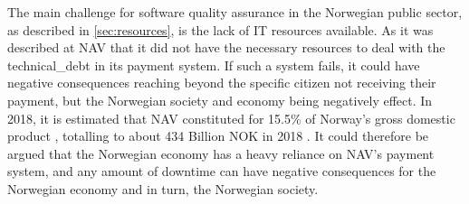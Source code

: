 The main challenge for software quality assurance in the Norwegian public sector, as described in \autoref{sec:resources}, is the lack of IT resources available. As it was described at NAV that it did not have the necessary resources to deal with the \gls{technical_debt} in its payment system. If such a system fails, it could have negative consequences reaching beyond the specific citizen not receiving their payment, but the Norwegian society and economy being negatively effect. In 2018, it is estimated that NAV constituted for 15.5\% of Norway's gross domestic product \cite{nav_ytelsene_frem_mot_2060_2019}, totalling to about 434 Billion NOK in 2018 \cite{faktaark_finansdepartementet_2020}. It could therefore be argued that the Norwegian economy has a heavy reliance on NAV's payment system, and any amount of downtime can have negative consequences for the Norwegian economy and in turn, the Norwegian society.




